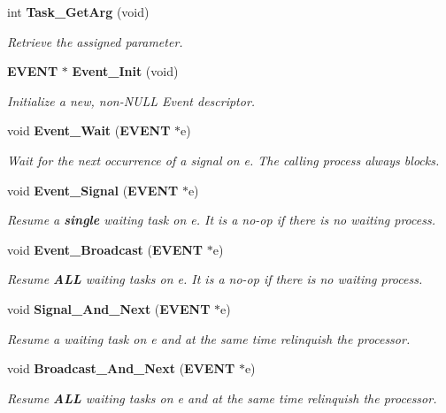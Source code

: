 \begin{CompactItemize}
int {\bf Task\_\-Get\-Arg} (void)
\begin{CompactList}\small\item\em Retrieve the assigned parameter. \item\end{CompactList}\item 
{\bf EVENT} $\ast$ {\bf Event\_\-Init} (void)
\begin{CompactList}\small\item\em Initialize a new, non-NULL Event descriptor. \item\end{CompactList}\item 
void {\bf Event\_\-Wait} ({\bf EVENT} $\ast$e)
\begin{CompactList}\small\item\em Wait for the next occurrence of a signal on {\em e\/}. The calling process always blocks. \item\end{CompactList}\item 
void {\bf Event\_\-Signal} ({\bf EVENT} $\ast$e)
\begin{CompactList}\small\item\em Resume a {\bf single} waiting task on {\em e\/}. It is a {\em no-op\/} if there is no waiting process. \item\end{CompactList}\item 
void {\bf Event\_\-Broadcast} ({\bf EVENT} $\ast$e)
\begin{CompactList}\small\item\em Resume {\bf ALL} waiting tasks on {\em e\/}. It is a {\em no-op\/} if there is no waiting process. \item\end{CompactList}\item 
void {\bf Signal\_\-And\_\-Next} ({\bf EVENT} $\ast$e)
\begin{CompactList}\small\item\em Resume a waiting task on {\em e\/} and at the same time relinquish the processor. \item\end{CompactList}\item 
void {\bf Broadcast\_\-And\_\-Next} ({\bf EVENT} $\ast$e)
\begin{CompactList}\small\item\em Resume {\bf ALL} waiting tasks on {\em e\/} and at the same time relinquish the processor. \item\end{CompactList}\end{CompactItemize}
